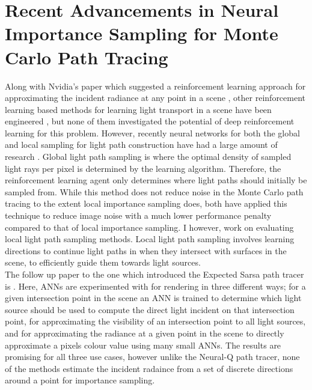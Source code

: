 \documentclass[../dissertation.tex]{subfiles}
\begin{document}
\section{Recent Advancements in Neural Importance Sampling for Monte Carlo Path Tracing}
\label{sec:recent_advancements}


Along with Nvidia's paper which suggested a reinforcement learning approach for approximating the incident radiance at any point in a scene \cite{dahm2017learning}, other reinforcement learning based methods for learning light transport in a scene have been engineered \cite{muller2017practical, vorba2014line}, but none of them investigated the potential of deep reinforcement learning for this problem. However, recently neural networks for both the global and local sampling for light path construction have had a large amount of research \cite{zheng2018learning, muller2018neural, keller2019integral, hermosilla2018deep}. Global light path sampling is where the optimal density of sampled light rays per pixel is determined by the learning algorithm. Therefore, the reinforcement learning agent only determines where light paths should initially be sampled from. While this method does not reduce noise in the Monte Carlo path tracing to the extent local importance sampling does, both \cite{muller2017practical, zheng2018learning} have applied this technique to reduce image noise with a much lower performance penalty compared to that of local importance sampling. I however, work on evaluating local light path sampling methods. Local light path sampling involves learning directions to continue light paths in when they intersect with surfaces in the scene, to efficiently guide them towards light sources.\\

 The follow up paper to the one which introduced the Expected Sarsa path tracer \cite{dahm2017learning} is \cite{keller2019integral}. Here, ANNs are experimented with for rendering in three different ways; for a given intersection point in the scene an ANN is trained to determine which light source should be used to compute the direct light incident on that intersection point, for approximating the visibility of an intersection point to all light sources, and for approximating the radiance at a given point in the scene to directly approximate a pixels colour value using many small ANNs. The results are promising for all three use cases, however unlike the Neural-Q path tracer, none of the methods estimate the incident radaince from a set of discrete directions around a point for importance sampling.\\
 
\end{document}
